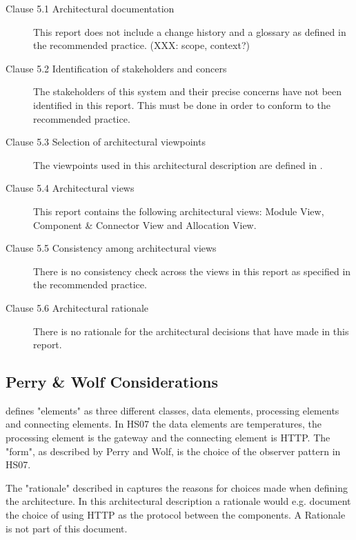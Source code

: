 \documentclass[a4paper,10pt]{article}
\begin{document}
\begin{description}
	\item[Clause 5.1 Architectural documentation] This report does not include a change history
		and a glossary as defined in the recommended practice. (XXX: scope, context?)
	\item[Clause 5.2 Identification of stakeholders and concers] The stakeholders of this system and
		their precise concerns have not been identified in this report. This must be done in order to
		conform to the recommended practice.
	\item[Clause 5.3 Selection of architectural viewpoints] The viewpoints used in this architectural
		description are defined in \cite{christensen2004archdesc}.
	\item[Clause 5.4 Architectural views] This report contains the following architectural views: Module
		View, Component \& Connector View and Allocation View.
	\item[Clause 5.5 Consistency among architectural views] There is no consistency check across the views
		in this report as specified in the recommended practice.
	\item[Clause 5.6 Architectural rationale] There is no rationale for the architectural decisions
		that have made in this report.
\end{description}


\subsection{Perry \& Wolf Considerations}

\cite{perrywolf1992} defines "elements" as three different classes, data elements,
processing elements and connecting elements. In HS07 the data elements are
temperatures, the processing element is the gateway and the connecting element
is HTTP. The "form", as described by Perry and Wolf, is the choice of the observer
pattern in HS07.

The "rationale" described in \cite{perrywolf1992} captures the reasons for choices
made when defining the architecture. In this architectural description a rationale
would e.g. document the choice of using HTTP as the protocol between the components. A
Rationale is not part of this document.




\end{document}
